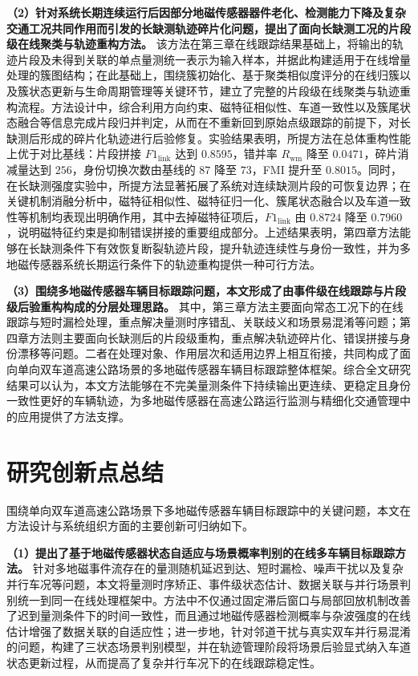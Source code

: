 \documentclass{xdupgthesis}
\begin{document}
\noindent\textbf{（2）针对系统长期连续运行后因部分地磁传感器器件老化、检测能力下降及复杂交通工况共同作用而引发的长缺测轨迹碎片化问题，提出了面向长缺测工况的片段级在线聚类与轨迹重构方法。} 该方法在第三章在线跟踪结果基础上，将输出的轨迹片段及未得到关联的单点量测统一表示为输入样本，并据此构建适用于在线增量处理的簇图结构；在此基础上，围绕簇初始化、基于聚类相似度评分的在线归簇以及簇状态更新与生命周期管理等关键环节，建立了完整的片段级在线聚类与轨迹重构流程。方法设计中，综合利用方向约束、磁特征相似性、车道一致性以及簇尾状态融合等信息完成片段归并判定，从而在不重新回到原始点级跟踪的前提下，对长缺测后形成的碎片化轨迹进行后验修复。实验结果表明，所提方法在总体重构性能上优于对比基线：片段拼接 $F1_{\mathrm{link}}$ 达到 $0.8595$，错并率 $R_{\mathrm{wm}}$ 降至 $0.0471$，碎片消减量达到 $256$，身份切换次数由基线的 $87$ 降至 $73$，FMI 提升至 $0.8015$。同时，在长缺测强度实验中，所提方法显著拓展了系统对连续缺测片段的可恢复边界；在关键机制消融分析中，磁特征相似性、磁特征归一化、簇尾状态融合以及车道一致性等机制均表现出明确作用，其中去掉磁特征项后，$F1_{\mathrm{link}}$ 由 $0.8724$ 降至 $0.7960$，说明磁特征约束是抑制错误拼接的重要组成部分。上述结果表明，第四章方法能够在长缺测条件下有效恢复断裂轨迹片段，提升轨迹连续性与身份一致性，并为多地磁传感器系统长期运行条件下的轨迹重构提供一种可行方法。

\noindent\textbf{（3）围绕多地磁传感器车辆目标跟踪问题，本文形成了由事件级在线跟踪与片段级后验重构构成的分层处理思路。} 其中，第三章方法主要面向常态工况下的在线跟踪与短时漏检处理，重点解决量测时序错乱、关联歧义和场景易混淆等问题；第四章方法则主要面向长缺测后的片段级重构，重点解决轨迹碎片化、错误拼接与身份漂移等问题。二者在处理对象、作用层次和适用边界上相互衔接，共同构成了面向单向双车道高速公路场景的多地磁传感器车辆目标跟踪整体框架。综合全文研究结果可以认为，本文方法能够在不完美量测条件下持续输出更连续、更稳定且身份一致性更好的车辆轨迹，为多地磁传感器在高速公路运行监测与精细化交通管理中的应用提供了方法支撑。

\section{研究创新点总结}

围绕单向双车道高速公路场景下多地磁传感器车辆目标跟踪中的关键问题，本文在方法设计与系统组织方面的主要创新可归纳如下。

\noindent\textbf{（1）提出了基于地磁传感器状态自适应与场景概率判别的在线多车辆目标跟踪方法。} 针对多地磁事件流存在的量测随机延迟到达、短时漏检、噪声干扰以及复杂并行车况等问题，本文将量测时序矫正、事件级状态估计、数据关联与并行场景判别统一到同一在线处理框架中。方法中不仅通过固定滞后窗口与局部回放机制改善了迟到量测条件下的时间一致性，而且通过地磁传感器检测概率与杂波强度的在线估计增强了数据关联的自适应性；进一步地，针对邻道干扰与真实双车并行易混淆的问题，构建了三状态场景判别模型，并在轨迹管理阶段将场景后验显式纳入车道状态更新过程，从而提高了复杂并行车况下的在线跟踪稳定性。
\end{document}
